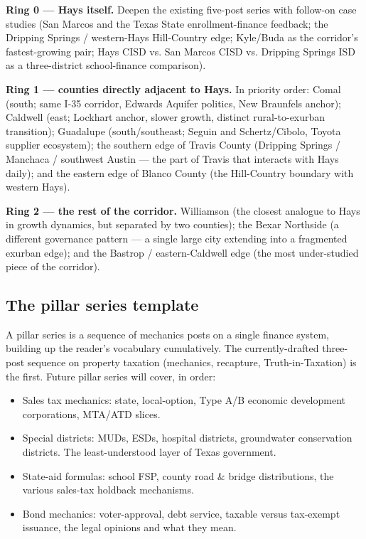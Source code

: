 \documentclass[11pt]{article}
\begin{document}
\textbf{Ring 0 --- Hays itself.} Deepen the existing five-post
series with follow-on case studies (San Marcos and the
Texas State enrollment-finance feedback; the Dripping Springs /
western-Hays Hill-Country edge; Kyle/Buda as the corridor's
fastest-growing pair; Hays CISD vs. San Marcos CISD vs.
Dripping Springs ISD as a three-district school-finance
comparison).

\textbf{Ring 1 --- counties directly adjacent to Hays.} In
priority order: Comal (south; same I-35 corridor, Edwards
Aquifer politics, New Braunfels anchor); Caldwell (east; Lockhart
anchor, slower growth, distinct rural-to-exurban transition);
Guadalupe (south/southeast; Seguin and Schertz/Cibolo, Toyota
supplier ecosystem); the southern edge of Travis County
(Dripping Springs / Manchaca / southwest Austin --- the part of
Travis that interacts with Hays daily); and the eastern edge of
Blanco County (the Hill-Country boundary with western Hays).

\textbf{Ring 2 --- the rest of the corridor.} Williamson (the
closest analogue to Hays in growth dynamics, but separated by
two counties); the Bexar Northside (a different governance
pattern --- a single large city extending into a fragmented
exurban edge); and the Bastrop / eastern-Caldwell edge (the
most under-studied piece of the corridor).

\subsection{The pillar series template}

A pillar series is a sequence of mechanics posts on a single
finance system, building up the reader's vocabulary cumulatively.
The currently-drafted three-post sequence on property taxation
(mechanics, recapture, Truth-in-Taxation) is the first. Future
pillar series will cover, in order:

\begin{itemize}
\item Sales tax mechanics: state, local-option, Type A/B
economic development corporations, MTA/ATD slices.
\item Special districts: MUDs, ESDs, hospital districts,
groundwater conservation districts. The least-understood layer of
Texas government.
\item State-aid formulas: school FSP, county road \& bridge
distributions, the various sales-tax holdback mechanisms.
\item Bond mechanics: voter-approval, debt service, taxable
versus tax-exempt issuance, the legal opinions and what they
mean.
\end{itemize}
\end{document}
